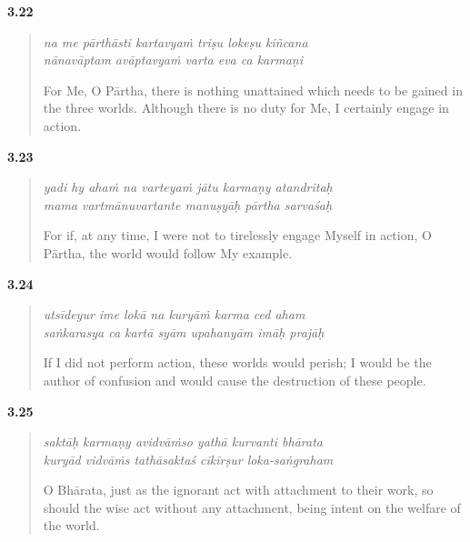 \par\noindent\textbf{3.22}\par
\begin{verse}
\textit{na me pārthāsti kartavyaṁ triṣu lokeṣu kiñcana} \\
\textit{nānavāptam avāptavyaṁ varta eva ca karmaṇi}

\noindent For Me, O Pārtha, there is nothing unattained which needs to be gained in the three worlds. Although there is no duty for Me, I certainly engage in action.
\end{verse}
\par



\par\noindent\textbf{3.23}\par
\begin{verse}
\textit{yadi hy ahaṁ na varteyaṁ jātu karmaṇy atandritaḥ} \\
\textit{mama vartmānuvartante manuṣyāḥ pārtha sarvaśaḥ}

\noindent For if, at any time, I were not to tirelessly engage Myself in action, O Pārtha, the world would follow My example.
\end{verse}
\par



\par\noindent\textbf{3.24}\par
\begin{verse}
\textit{utsīdeyur ime lokā na kuryāṁ karma ced aham} \\
\textit{saṅkarasya ca kartā syām upahanyām imāḥ prajāḥ}

\noindent If I did not perform action, these worlds would perish; I would be the author of confusion and would cause the destruction of these people.
\end{verse}
\par



\par\noindent\textbf{3.25}\par
\begin{verse}
\textit{saktāḥ karmaṇy avidvāṁso yathā kurvanti bhārata} \\
\textit{kuryād vidvāṁs tathāsaktaś cikīrṣur loka-saṅgraham}

\noindent O Bhārata, just as the ignorant act with attachment to their work, so should the wise act without any attachment, being intent on the welfare of the world.
\end{verse}
\par



